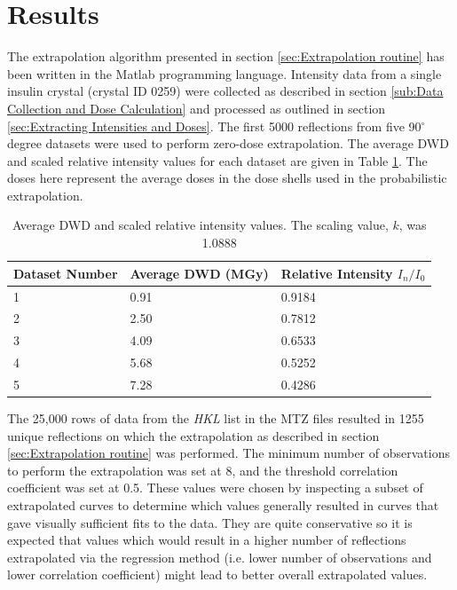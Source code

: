 \section{Results}
\label{sec:Results - Zero-dose extrapolation}
The extrapolation algorithm presented in section \ref{sec:Extrapolation routine} has been written in the Matlab programming language.
Intensity data from a single insulin crystal (crystal ID 0259) were collected as described in section \ref{sub:Data Collection and Dose Calculation} and processed as outlined in section \ref{sec:Extracting Intensities and Doses}.
The first 5000 reflections from five 90$^{\circ}$ degree datasets were used to perform zero-dose extrapolation.
The average DWD and scaled relative intensity values for each dataset are given in Table \ref{tab:Average DWD and Relative Intensity}.
The doses here represent the average doses in the dose shells used in the probabilistic extrapolation.
\begin{table}[ht!]
	\caption[Average DWD and scaled relative intensity values.]{Average DWD and scaled relative intensity values. The scaling value, $k$, was 1.0888}
	\centering
	\begin{tabular}{p{3.2cm} | p{3.75cm} | p{4.3cm}}
		Dataset Number    & Average DWD (MGy)     & Relative Intensity $I_n/I_0$ \\
		\hline
		1                 & 0.91                  & 0.9184 \\
		2                 & 2.50                  & 0.7812 \\
		3                 & 4.09                  & 0.6533 \\
        4                 & 5.68                  & 0.5252 \\
        5                 & 7.28                  & 0.4286 \\
	\end{tabular}
	\label{tab:Average DWD and Relative Intensity}
\end{table}
The 25,000 rows of data from the \textit{HKL} list in the MTZ files resulted in 1255 unique reflections on which the extrapolation as described in section \ref{sec:Extrapolation routine} was performed.
The minimum number of observations to perform the extrapolation was set at 8, and the threshold correlation coefficient was set at 0.5.
These values were chosen by inspecting a subset of extrapolated curves to determine which values generally resulted in curves that gave visually sufficient fits to the data.
They are quite conservative so it is expected that values which would result in a higher number of reflections extrapolated via the regression method (i.e. lower number of observations and lower correlation coefficient) might lead to better overall extrapolated values.
